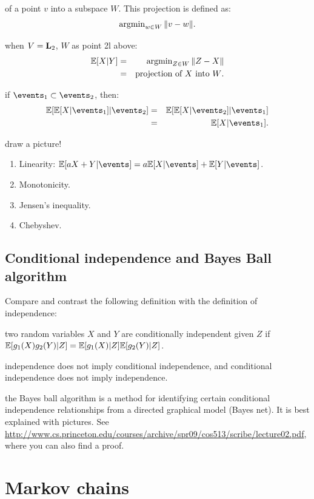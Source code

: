 \documentclass{article}
\begin{document}
 of a point $v$ into a subspace $W$. This projection is defined as:
\[ \operatorname{argmin}_{w \in W} \| v - w\|. \]

 when $V = \mathbf L_2$, $W$ as point 2l above:
\begin{eqnarray*}
{\mathbb E}[X|Y] &=& \operatorname{argmin}_{Z \in W} \| Z - X \| \\
&=& \text{projection of $X$ into $W$.}
\end{eqnarray*}

 if $\events_1 \subset \events_2$, then:
\begin{eqnarray*}
\E[\E[X|\events_1]|\events_2] &=& \E[\E[X|\events_2]|\events_1] \\
&=& \E[X | \events_1].
\end{eqnarray*}

 draw a picture!

\begin{enumerate}
  \item Linearity: $\E[a X + Y|\events] = a \E[X|\events] + \E[Y|\events]$.
  \item Monotonicity.
  \item Jensen's inequality.
  \item Chebyshev.
\end{enumerate}


\subsection{Conditional independence and Bayes Ball algorithm}

Compare and contrast the following definition with the definition of independence:

 two random variables $X$ and $Y$ are conditionally independent given $Z$ if ${\mathbb E}[g_1(X) g_2(Y)|Z] = {\mathbb E}[g_1(X)|Z] {\mathbb E}[g_2(Y)|Z]$. 

 independence does not imply conditional independence, and conditional independence does not imply independence.

 the Bayes ball algorithm is a method for identifying certain conditional independence relationships from a directed graphical model (Bayes net). It is best explained with pictures. See {\footnotesize \url{http://www.cs.princeton.edu/courses/archive/spr09/cos513/scribe/lecture02.pdf}}, where you can also find a proof.


\section{Markov chains}
\end{document}
